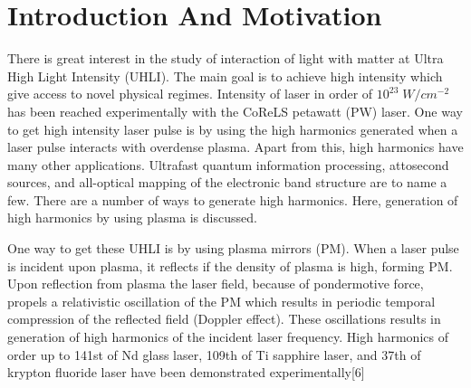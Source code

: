 \documentclass[12pt]{article}
\newenvironment{changemargin}[2]{
\begin{list}{}{
\setlength{\topsep}{0pt}
\setlength{\leftmargin}{#1}
\setlength{\rightmargin}{#2}
\setlength{\listparindent}{\parindent}
\setlength{\itemindent}{\parindent}
\setlength{\parsep}{\parskip}
}
\item[]}{\end{list}}
\begin{document}
\newpage
\begin{changemargin}{-2cm}{-2cm}
    \section{Introduction And Motivation}
    There is great interest in the study of interaction of light with matter at Ultra High Light Intensity (UHLI). The main goal is to achieve high intensity which give access to novel physical regimes.\cite{henri}
    Intensity of laser in order of $10^{23} \; W/cm^{-2}$ has been reached experimentally with the CoReLS petawatt (PW) laser.\cite{highintensity} One way to get high intensity laser pulse is by using the high harmonics generated when a laser pulse interacts with overdense plasma. Apart from this, high harmonics have many other applications. Ultrafast quantum information processing, attosecond sources, and all-optical mapping of the electronic band structure are to name a few. There are a number of ways to generate high harmonics. Here, generation of high harmonics by using plasma is discussed.

    One way to get these UHLI is by using plasma mirrors (PM). When a laser pulse is incident upon plasma, it reflects if the density of plasma is high, forming PM. Upon reflection from plasma the laser field, because of pondermotive force, propels a relativistic oscillation of the PM which results in periodic temporal compression of the reflected field (Doppler effect). These oscillations results in generation of high harmonics of the incident laser frequency.\cite{lichters} High harmonics of order up to 141st of Nd glass laser\cite{hormonics1}, 109th of Ti sapphire laser\cite{hormonics2}, and 37th of krypton fluoride laser\cite{hormonics3} have been demonstrated experimentally[6]


\end{changemargin}
\end{document}

